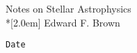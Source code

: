 \documentclass[11pt]{book}
\begin{document}
\newcommand{\thetitle}{Notes on Stellar Astrophysics}
\newcommand{\theauthor}{Edward F. Brown}

\begin{titlepage}
\vspace*{2.5in}
\begin{center}
\LARGE{\thetitle}\\*[2.0em]
\large{\theauthor}
\end{center}
\vspace*{3.0in}
\small{\verb$Date$}
\end{titlepage}

\tableofcontents












\appendix


\end{document}
